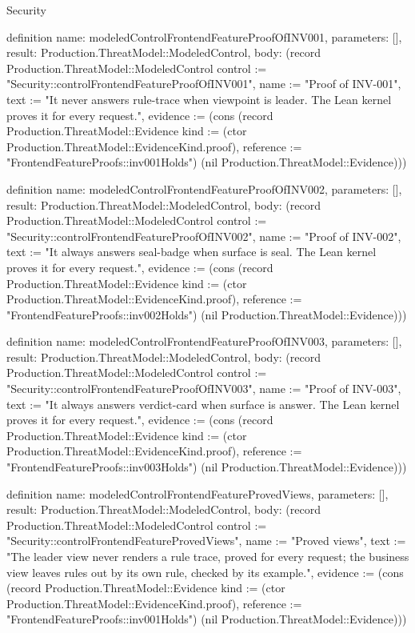 \begin{lexlean}{Security}
\begin{semanticmodule}
definition{
  name: modeledControlFrontendFeatureProofOfINV001,
  parameters: [],
  result: Production.ThreatModel::ModeledControl,
  body: (record Production.ThreatModel::ModeledControl {control := "Security::controlFrontendFeatureProofOfINV001", name := "Proof of INV-001", text := "It never answers rule-trace when viewpoint is leader. The Lean kernel proves it for every request.", evidence := (cons (record Production.ThreatModel::Evidence {kind := (ctor Production.ThreatModel::EvidenceKind.proof), reference := "FrontendFeatureProofs::inv001Holds"}) (nil Production.ThreatModel::Evidence))})
}

definition{
  name: modeledControlFrontendFeatureProofOfINV002,
  parameters: [],
  result: Production.ThreatModel::ModeledControl,
  body: (record Production.ThreatModel::ModeledControl {control := "Security::controlFrontendFeatureProofOfINV002", name := "Proof of INV-002", text := "It always answers seal-badge when surface is seal. The Lean kernel proves it for every request.", evidence := (cons (record Production.ThreatModel::Evidence {kind := (ctor Production.ThreatModel::EvidenceKind.proof), reference := "FrontendFeatureProofs::inv002Holds"}) (nil Production.ThreatModel::Evidence))})
}

definition{
  name: modeledControlFrontendFeatureProofOfINV003,
  parameters: [],
  result: Production.ThreatModel::ModeledControl,
  body: (record Production.ThreatModel::ModeledControl {control := "Security::controlFrontendFeatureProofOfINV003", name := "Proof of INV-003", text := "It always answers verdict-card when surface is answer. The Lean kernel proves it for every request.", evidence := (cons (record Production.ThreatModel::Evidence {kind := (ctor Production.ThreatModel::EvidenceKind.proof), reference := "FrontendFeatureProofs::inv003Holds"}) (nil Production.ThreatModel::Evidence))})
}

definition{
  name: modeledControlFrontendFeatureProvedViews,
  parameters: [],
  result: Production.ThreatModel::ModeledControl,
  body: (record Production.ThreatModel::ModeledControl {control := "Security::controlFrontendFeatureProvedViews", name := "Proved views", text := "The leader view never renders a rule trace, proved for every request; the business view leaves rules out by its own rule, checked by its example.", evidence := (cons (record Production.ThreatModel::Evidence {kind := (ctor Production.ThreatModel::EvidenceKind.proof), reference := "FrontendFeatureProofs::inv001Holds"}) (nil Production.ThreatModel::Evidence))})
}


\end{semanticmodule}
\end{lexlean}
